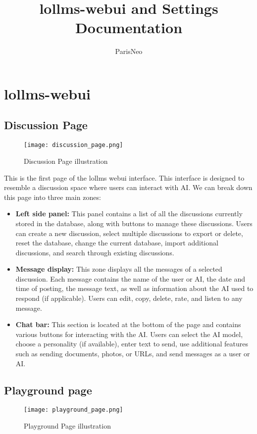 \documentclass{article}
\title{lollms-webui and Settings Documentation}
\author{ParisNeo}
\date{}
\begin{document}
\maketitle

\section{lollms-webui}

\subsection{Discussion Page}
\begin{figure}[h]
  \centering
  \texttt{[image: discussion\_page.png]}
  \caption{Discussion Page illustration}
\end{figure}
This is the first page of the lollms webui interface. This interface is designed to resemble a discussion space where users can interact with AI. We can break down this page into three main zones:
\begin{itemize}[noitemsep,topsep=0pt]
\item \textbf{Left side panel:} This panel contains a list of all the discussions currently stored in the database, along with buttons to manage these discussions. Users can create a new discussion, select multiple discussions to export or delete, reset the database, change the current database, import additional discussions, and search through existing discussions.
\item \textbf{Message display:} This zone displays all the messages of a selected discussion. Each message contains the name of the user or AI, the date and time of posting, the message text, as well as information about the AI used to respond (if applicable). Users can edit, copy, delete, rate, and listen to any message.
\item \textbf{Chat bar:} This section is located at the bottom of the page and contains various buttons for interacting with the AI. Users can select the AI model, choose a personality (if available), enter text to send, use additional features such as sending documents, photos, or URLs, and send messages as a user or AI.
\end{itemize}

\subsection{Playground page}
\begin{figure}[h]
  \centering
  \texttt{[image: playground\_page.png]}
  \caption{Playground Page illustration}
\end{figure}
\end{document}
